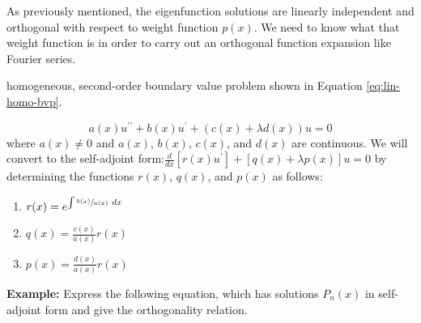 As previously mentioned, the eigenfunction solutions are linearly independent and orthogonal with respect to weight function $p(x)$.  We need to know what that weight function is in order to carry out an orthogonal function expansion like Fourier series.  

 homogeneous, second-order boundary value problem shown in Equation \ref{eq:lin-homo-bvp}.

\begin{equation}
a(x)u^{\prime \prime} + b(x)u^{\prime} + (c(x) + \lambda d(x))u = 0
\label{eq:lin-homo-bvp}
\end{equation}
where $a(x) \ne 0$ and $a(x)$, $b(x)$, $c(x)$, and $d(x)$ are continuous.  We will convert to the self-adjoint form:$\frac{d}{dx}\left[r(x)u^{\prime}\right]+[q(x)+\lambda p(x)]u =0$ by determining the functions $r(x)$, $q(x)$, and $p(x)$ as follows:
\begin{enumerate}
\item $r(x) = e^{\int \sfrac{b(x)}{a(x)} \ dx}$
\item $q(x) = \frac{c(x)}{a(x)}r(x)$
\item $p(x) = \frac{d(x)}{a(x)}r(x)$
\end{enumerate}

\vspace{5.5cm}

\noindent\textbf{Example:} Express the following equation, which has solutions $P_n(x)$ in self-adjoint form and give the orthogonality relation.

